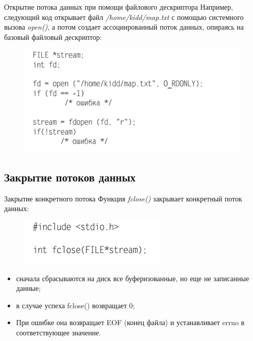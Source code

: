 \documentclass{beamer}
\begin{document}
\begin{frame}{Открытие потока данных при помощи файлового дескриптора}
Например, следующий код открывает файл \textit{/home/kidd/map.txt} с помощью системного вызова \textit{open()}, а потом создает ассоциированный поток данных, опираясь на базовый файловый дескриптор:
\begin{figure}[h]
\centering
\includegraphics[scale=0.6]{images/lec05-pic07.png}
\end{figure}
\end{frame}

\subsection{Закрытие потоков данных}

\begin{frame}{Закрытие конкретного потока}
Функция \textit{fclose()} закрывает конкретный поток данных:
\begin{figure}[h]
\centering
\includegraphics[scale=0.5]{images/lec05-pic08.png}
\end{figure}
\begin{itemize}
\item сначала сбрасываются на диск все буферизованные, но еще не записанные данные;
\item в случае успеха fclose() возвращает 0; 
\item При ошибке она возвращает EOF (конец файла) и устанавливает errno в соответствующее значение.
\end{itemize}
\end{frame}
\end{document}
